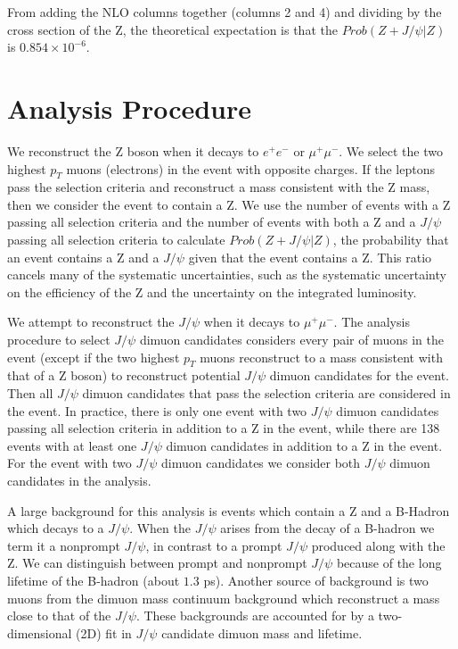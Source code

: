 \documentclass[a4paper,12pt]{article}
\begin{document}
From adding the NLO columns together (columns 2 and 4) and dividing by the cross section of the Z, the theoretical expectation is that the $Prob(Z + J\slash \psi | Z)$ is $0.854 \times 10^{-6}$.

\section{Analysis Procedure}
We reconstruct the Z boson when it decays to $e^+e^-$ or $\mu^+\mu^-$. We select the two highest $p_T$ muons (electrons) in the event with opposite charges. If the leptons pass the selection criteria and reconstruct a mass consistent with the Z mass, then we consider the event to contain a Z. We use the number of events with a Z passing all selection criteria and the number of events with both a Z and a $J\slash \psi$ passing all selection criteria to calculate $Prob(Z + J\slash \psi | Z)$, the probability that an event contains a Z and a $J\slash \psi$ given that the event contains a Z. This ratio cancels many of the systematic uncertainties, such as the systematic uncertainty on the efficiency of the Z and the uncertainty on the integrated luminosity.

We attempt to reconstruct the $J\slash \psi$ when it decays to $\mu^+\mu^-$. The analysis procedure to select $J\slash \psi$ dimuon candidates considers every pair of muons in the event (except if the two highest $p_{T}$ muons reconstruct to a mass consistent with that of a Z boson) to reconstruct potential $J\slash \psi$ dimuon candidates for the event. Then all $J\slash \psi$ dimuon candidates that pass the selection criteria are considered in the event. In practice, there is only one event with two $J\slash \psi$ dimuon candidates passing all selection criteria in addition to a Z in the event, while there are 138 events with at least one $J\slash \psi$ dimuon candidates in addition to a Z in the event. For the event with two $J\slash \psi$ dimuon candidates we consider both $J\slash \psi$ dimuon candidates in the analysis.

A large background for this analysis is events which contain a Z and a B-Hadron which decays to a $J\slash \psi$. When the $J\slash \psi$ arises from the decay of a B-hadron we term it a nonprompt $J\slash \psi$, in contrast to a prompt $J\slash \psi$ produced along with the Z. We can distinguish between prompt and nonprompt $J\slash \psi$ because of the long lifetime of the B-hadron (about $1.3$ ps). Another source of background is two muons from the dimuon mass continuum background which reconstruct a mass close to that of the $J\slash \psi$. These backgrounds are accounted for by a two-dimensional (2D) fit in $J\slash \psi$ candidate dimuon mass and lifetime.
\end{document}
